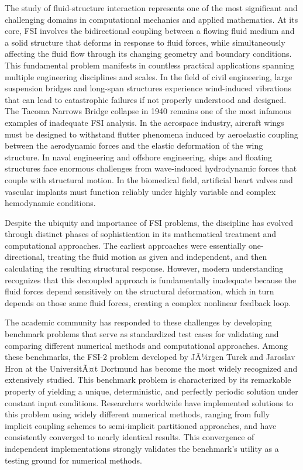 ﻿\documentclass[a4paper,11pt]{article}
\theoremstyle{definition}
\begin{document}
The study of fluid-structure interaction represents one of the most significant and challenging domains in computational mechanics and applied mathematics. At its core, FSI involves the bidirectional coupling between a flowing fluid medium and a solid structure that deforms in response to fluid forces, while simultaneously affecting the fluid flow through its changing geometry and boundary conditions. This fundamental problem manifests in countless practical applications spanning multiple engineering disciplines and scales. In the field of civil engineering, large suspension bridges and long-span structures experience wind-induced vibrations that can lead to catastrophic failures if not properly understood and designed. The Tacoma Narrows Bridge collapse in 1940 remains one of the most infamous examples of inadequate FSI analysis. In the aerospace industry, aircraft wings must be designed to withstand flutter phenomena induced by aeroelastic coupling between the aerodynamic forces and the elastic deformation of the wing structure. In naval engineering and offshore engineering, ships and floating structures face enormous challenges from wave-induced hydrodynamic forces that couple with structural motion. In the biomedical field, artificial heart valves and vascular implants must function reliably under highly variable and complex hemodynamic conditions.

Despite the ubiquity and importance of FSI problems, the discipline has evolved through distinct phases of sophistication in its mathematical treatment and computational approaches. The earliest approaches were essentially one-directional, treating the fluid motion as given and independent, and then calculating the resulting structural response. However, modern understanding recognizes that this decoupled approach is fundamentally inadequate because the fluid forces depend sensitively on the structural deformation, which in turn depends on those same fluid forces, creating a complex nonlinear feedback loop.

The academic community has responded to these challenges by developing benchmark problems that serve as standardized test cases for validating and comparing different numerical methods and computational approaches. Among these benchmarks, the FSI-2 problem developed by JÃ¼rgen Turek and Jaroslav Hron at the UniversitÃ¤t Dortmund has become the most widely recognized and extensively studied. This benchmark problem is characterized by its remarkable property of yielding a unique, deterministic, and perfectly periodic solution under constant input conditions. Researchers worldwide have implemented solutions to this problem using widely different numerical methods, ranging from fully implicit coupling schemes to semi-implicit partitioned approaches, and have consistently converged to nearly identical results. This convergence of independent implementations strongly validates the benchmark's utility as a testing ground for numerical methods.
\end{document}
